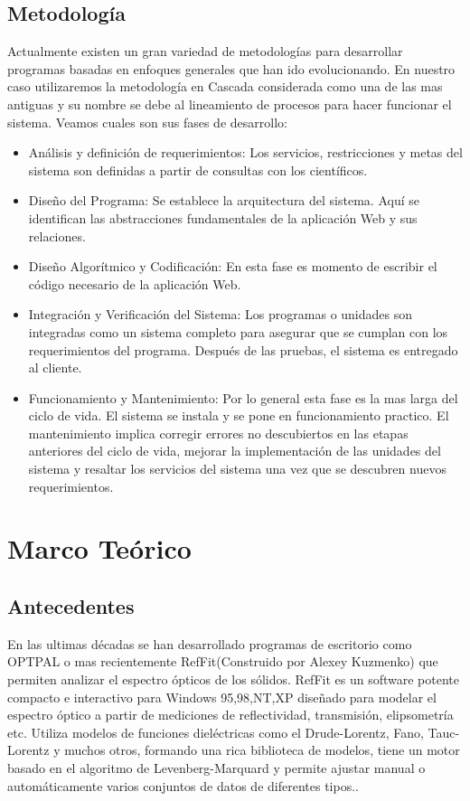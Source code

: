 \documentclass[a4paper,openright,12pt]{book}
\begin{document}
\section{Metodología}
Actualmente existen un gran variedad de metodologías para desarrollar programas basadas en enfoques generales que han ido evolucionando. En nuestro caso utilizaremos la metodología en Cascada considerada como una de las mas antiguas y su nombre se debe al lineamiento de procesos para hacer funcionar el sistema. Veamos cuales son sus fases de desarrollo:\cite{ingsof}
\begin{itemize}
\item Análisis y definición de requerimientos: Los servicios, restricciones y metas del sistema son definidas a partir de consultas con los científicos.

\item Diseño del Programa: Se establece la arquitectura del sistema. Aquí se identifican las abstracciones fundamentales de la aplicación Web y sus relaciones.
\item Diseño Algorítmico y Codificación: En esta fase es momento de escribir el código necesario de la aplicación Web.
\item Integración y Verificación del Sistema: Los programas o unidades son integradas como un sistema completo para asegurar que se cumplan con los requerimientos del programa. Después de las pruebas, el sistema es entregado al cliente.
\item Funcionamiento y Mantenimiento: Por lo general esta fase es la mas larga del ciclo de vida. El sistema se instala y se pone en funcionamiento practico. El mantenimiento implica corregir errores no descubiertos en las etapas anteriores del ciclo de vida, mejorar la implementación de las unidades del sistema y resaltar los servicios del sistema una vez que se descubren nuevos requerimientos.
\end{itemize} 


\chapter{Marco Teórico}

\section{Antecedentes}

En las ultimas décadas se han desarrollado programas de escritorio como OPTPAL o mas recientemente RefFit(Construido por Alexey Kuzmenko) que permiten analizar el espectro ópticos de los sólidos.  RefFit es un software potente compacto e interactivo para Windows 95,98,NT,XP diseñado para modelar el espectro óptico a partir de mediciones de reflectividad, transmisión, elipsometría etc. Utiliza modelos de funciones dieléctricas como el Drude-Lorentz, Fano, Tauc-Lorentz y muchos otros, formando  una rica biblioteca de modelos, tiene un motor basado en el algoritmo de Levenberg-Marquard y permite ajustar manual o automáticamente varios conjuntos de datos de diferentes tipos.\cite{guide}.
\end{document}
